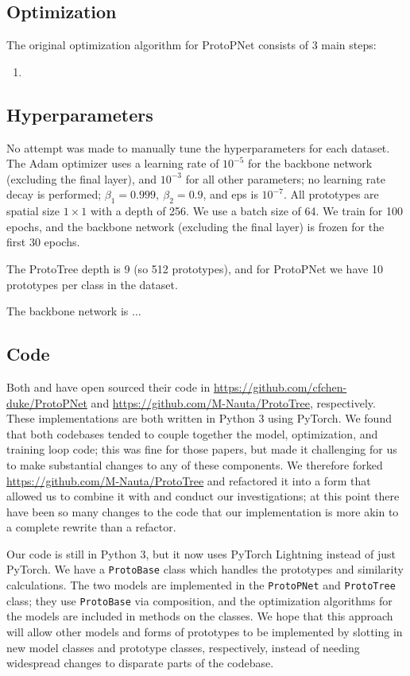 \documentclass{rescience}
\begin{document}
\subsection{Optimization}
The original optimization algorithm for ProtoPNet consists of 3 main steps:
\begin{enumerate}
\item 
\end{enumerate}

\subsection{Hyperparameters}
No attempt was made to manually tune the hyperparameters for each dataset. The Adam optimizer uses a learning rate of \(10^{-5}\) for the backbone network (excluding the final layer), and \(10^{-3}\) for all other parameters; no learning rate decay is performed; \(\beta_1=0.999,\ \beta_2=0.9\), and eps is \(10^{-7}\). All prototypes are spatial size \(1\times 1\) with a depth of 256. We use a batch size of 64. We train for 100 epochs, and the backbone network (excluding the final layer) is frozen for the first 30 epochs.

The ProtoTree depth is 9 (so 512 prototypes), and for ProtoPNet we have 10 prototypes per class in the dataset.

The backbone network is ...


\subsection{Code}
Both \cite{chen2019looks} and \cite{nauta2021neural} have open sourced their code in \url{https://github.com/cfchen-duke/ProtoPNet} and \url{https://github.com/M-Nauta/ProtoTree}, respectively. These implementations are both written in Python 3 using PyTorch. We found that both codebases tended to couple together the model, optimization, and training loop code; this was fine for those papers, but made it challenging for us to make substantial changes to any of these components. We therefore forked \url{https://github.com/M-Nauta/ProtoTree} and refactored it into a form that allowed us to combine it with \cite{chen2019looks} and conduct our investigations; at this point there have been so many changes to the code that our implementation is more akin to a complete rewrite than a refactor.

Our code is still in Python 3, but it now uses PyTorch Lightning instead of just PyTorch. We have a \texttt{ProtoBase} class which handles the prototypes and similarity calculations. The two models are implemented in the \texttt{ProtoPNet} and \texttt{ProtoTree} class; they use \texttt{ProtoBase} via composition, and the optimization algorithms for the models are included in methods on the classes. We hope that this approach will allow other models and forms of prototypes to be implemented by slotting in new model classes and prototype classes, respectively, instead of needing widespread changes to disparate parts of the codebase.
\end{document}
